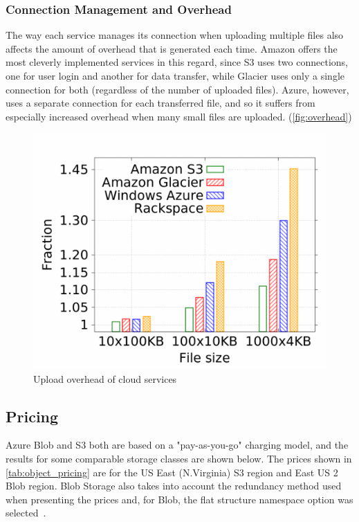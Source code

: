 \subsubsection{Connection Management and Overhead}
The way each service manages its connection when uploading multiple files also affects the amount of overhead that is generated each time. Amazon offers the most cleverly implemented services in this regard, since S3 uses two connections, one for user login and another for data transfer, while Glacier uses only a single connection for both (regardless of the number of uploaded files). Azure, however, uses a separate connection for each transferred file, and so it suffers from especially increased overhead when many small files are uploaded. (\autoref{fig:overhead})

\begin{figure} [h]
    \centering
    \includegraphics[scale=0.3]{images/overhead}
    \caption{\label{fig:overhead}Upload overhead of cloud services}
\end{figure}

\subsection{Pricing}
Azure Blob and S3 both are based on a "pay-as-you-go" charging model,  and the results for some comparable storage classes are shown below. The prices shown in \autoref{tab:object_pricing} are for the US East (N.Virginia) S3 region and East US 2 Blob region. Blob Storage also takes into account the redundancy method used when presenting the prices and, for Blob, the flat structure namespace option was selected~\cite{s3_pricing,blob_pricing}.

